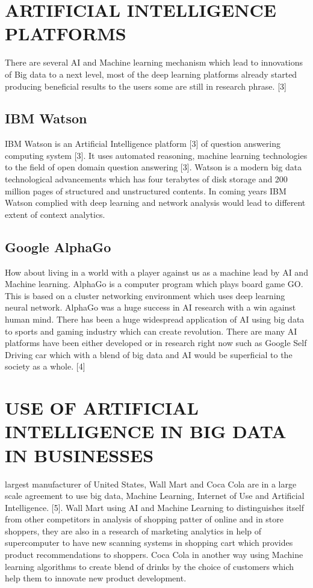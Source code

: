 \documentclass[sigconf]{acmart}
\begin{document}
\section{ARTIFICIAL INTELLIGENCE PLATFORMS}
There are several AI and Machine learning mechanism which lead to innovations of Big data to a next level, most of the deep learning platforms already started producing beneficial results to the users some are still in research phrase. [3]

\subsection{IBM Watson}
IBM Watson is an Artificial Intelligence platform [3] of question answering computing system [3].  It uses automated reasoning, machine learning technologies to the field of open domain question answering [3]. Watson is a modern big data technological advancements which has four terabytes of disk storage and 200 million pages of structured and unstructured contents. In coming years IBM Watson complied with deep learning and network analysis would lead to different extent of context analytics.

\subsection{Google AlphaGo}
How about living in a world with a player against us as a machine lead by AI and Machine learning. AlphaGo is a computer program which plays board game GO. This is based on a cluster networking environment which uses deep learning neural network. AlphaGo was a huge success in AI research with a win against human mind. There has been a huge widespread application of AI using big data to sports and gaming industry which can create revolution. There are many AI platforms have been either developed or in research right now such as Google Self Driving car which with a blend of big data and AI would be superficial to the society as a whole. [4]

\section{USE OF ARTIFICIAL INTELLIGENCE IN BIG DATA IN BUSINESSES }
largest manufacturer of United States, Wall Mart and Coca Cola are in a large scale agreement to use big data, Machine Learning, Internet of Use and Artificial Intelligence. [5]. Wall Mart using AI and Machine Learning to distinguishes itself from other competitors in analysis of shopping patter of online and in store shoppers, they are also in a research of marketing analytics in help of supercomputer to have new scanning systems in shopping cart which provides product recommendations to shoppers. Coca Cola in another way using Machine learning algorithms to create blend of drinks by the choice of customers which help them to innovate new product development. 
\end{document}
